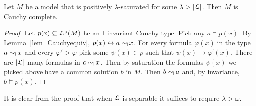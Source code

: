 \documentclass[10pt,oneside]{amsproc}
\begin{document}

\begin{fact}
  Let $M$ be a model that is positively $\lambda$-saturated for some $\lambda>|{\EuScript L}|$.
  Then $M$ is Cauchy complete.
\end{fact}

\begin{proof}  
  Let $p(x)\subseteq{\EuScript L}^{\rm p}(M)$ be an ${\sf I}$-invariant Cauchy type.
  Pick any $a\models p(x)$.
  By Lemma~\ref{lem_Cauchyequiv}, $p(x)\leftrightarrow a\sim_{\sf I}\!x$.
  For every formula $\varphi(x)$ in the type $a\sim_{\sf I}\!x$ and every $\varphi'>\varphi$ pick some $\psi(x)\in p$ such that $\psi(x)\rightarrow\varphi'(x)$.
  There are $|{\EuScript L}|$ many formulas in $a\sim_{\sf I}\!x$.
  Then by saturation the formulas $\psi(x)$ we picked above have a common solution $b$ in $M$.
  Then $b\sim_{\sf I}\!a$ and, by invariance, $b\models p(x)$.
\end{proof}

It is clear from the proof that when ${\EuScript L}$ is separable it suffices to require $\lambda>\omega$.
\end{document}
